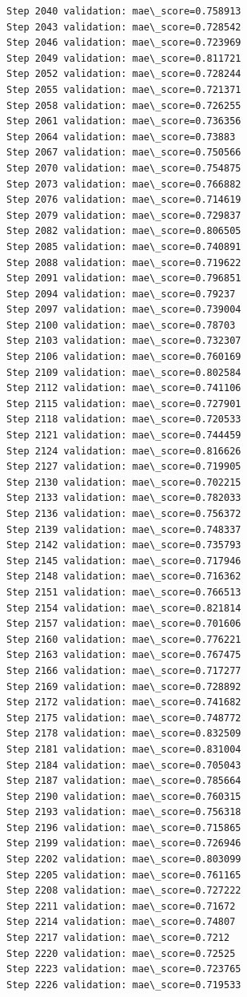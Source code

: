 \documentclass[11pt]{article}
\begin{document}
\begin{Verbatim}[commandchars=\\\{\}]
Step 2040 validation: mae\_score=0.758913
Step 2043 validation: mae\_score=0.728542
Step 2046 validation: mae\_score=0.723969
Step 2049 validation: mae\_score=0.811721
Step 2052 validation: mae\_score=0.728244
Step 2055 validation: mae\_score=0.721371
Step 2058 validation: mae\_score=0.726255
Step 2061 validation: mae\_score=0.736356
Step 2064 validation: mae\_score=0.73883
Step 2067 validation: mae\_score=0.750566
Step 2070 validation: mae\_score=0.754875
Step 2073 validation: mae\_score=0.766882
Step 2076 validation: mae\_score=0.714619
Step 2079 validation: mae\_score=0.729837
Step 2082 validation: mae\_score=0.806505
Step 2085 validation: mae\_score=0.740891
Step 2088 validation: mae\_score=0.719622
Step 2091 validation: mae\_score=0.796851
Step 2094 validation: mae\_score=0.79237
Step 2097 validation: mae\_score=0.739004
Step 2100 validation: mae\_score=0.78703
Step 2103 validation: mae\_score=0.732307
Step 2106 validation: mae\_score=0.760169
Step 2109 validation: mae\_score=0.802584
Step 2112 validation: mae\_score=0.741106
Step 2115 validation: mae\_score=0.727901
Step 2118 validation: mae\_score=0.720533
Step 2121 validation: mae\_score=0.744459
Step 2124 validation: mae\_score=0.816626
Step 2127 validation: mae\_score=0.719905
Step 2130 validation: mae\_score=0.702215
Step 2133 validation: mae\_score=0.782033
Step 2136 validation: mae\_score=0.756372
Step 2139 validation: mae\_score=0.748337
Step 2142 validation: mae\_score=0.735793
Step 2145 validation: mae\_score=0.717946
Step 2148 validation: mae\_score=0.716362
Step 2151 validation: mae\_score=0.766513
Step 2154 validation: mae\_score=0.821814
Step 2157 validation: mae\_score=0.701606
Step 2160 validation: mae\_score=0.776221
Step 2163 validation: mae\_score=0.767475
Step 2166 validation: mae\_score=0.717277
Step 2169 validation: mae\_score=0.728892
Step 2172 validation: mae\_score=0.741682
Step 2175 validation: mae\_score=0.748772
Step 2178 validation: mae\_score=0.832509
Step 2181 validation: mae\_score=0.831004
Step 2184 validation: mae\_score=0.705043
Step 2187 validation: mae\_score=0.785664
Step 2190 validation: mae\_score=0.760315
Step 2193 validation: mae\_score=0.756318
Step 2196 validation: mae\_score=0.715865
Step 2199 validation: mae\_score=0.726946
Step 2202 validation: mae\_score=0.803099
Step 2205 validation: mae\_score=0.761165
Step 2208 validation: mae\_score=0.727222
Step 2211 validation: mae\_score=0.71672
Step 2214 validation: mae\_score=0.74807
Step 2217 validation: mae\_score=0.7212
Step 2220 validation: mae\_score=0.72525
Step 2223 validation: mae\_score=0.723765
Step 2226 validation: mae\_score=0.719533

\end{Verbatim}
\end{document}
